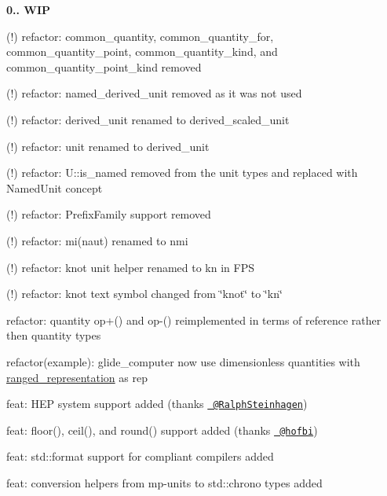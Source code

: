 
\begin{DoxyItemize}
\item {\bfseries{0.. WIP}}
\begin{DoxyItemize}
\item (!) refactor\+: {\ttfamily common\+\_\+quantity}, {\ttfamily common\+\_\+quantity\+\_\+for}, {\ttfamily common\+\_\+quantity\+\_\+point}, {\ttfamily common\+\_\+quantity\+\_\+kind}, and {\ttfamily common\+\_\+quantity\+\_\+point\+\_\+kind} removed
\item (!) refactor\+: {\ttfamily named\+\_\+derived\+\_\+unit} removed as it was not used
\item (!) refactor\+: {\ttfamily derived\+\_\+unit} renamed to {\ttfamily derived\+\_\+scaled\+\_\+unit}
\item (!) refactor\+: {\ttfamily unit} renamed to {\ttfamily derived\+\_\+unit}
\item (!) refactor\+: {\ttfamily U\+::is\+\_\+named} removed from the unit types and replaced with {\ttfamily Named\+Unit} concept
\item (!) refactor\+: {\ttfamily Prefix\+Family} support removed
\item (!) refactor\+: {\ttfamily mi(naut)} renamed to {\ttfamily nmi}
\item (!) refactor\+: {\ttfamily knot} unit helper renamed to {\ttfamily kn} in FPS
\item (!) refactor\+: {\ttfamily knot} text symbol changed from {\ttfamily \char`\"{}knot\char`\"{}} to {\ttfamily \char`\"{}kn\char`\"{}}
\item refactor\+: {\ttfamily quantity} {\ttfamily op+()} and {\ttfamily op-\/()} reimplemented in terms of {\ttfamily reference} rather then {\ttfamily quantity} types
\item refactor(example)\+: {\ttfamily glide\+\_\+computer} now use dimensionless quantities with {\ttfamily \mbox{\hyperlink{classranged__representation}{ranged\+\_\+representation}}} as {\ttfamily rep}
\item feat\+: HEP system support added (thanks \href{https://github.com/RalphSteinhagen}{\texttt{ @\+Ralph\+Steinhagen}})
\item feat\+: {\ttfamily floor()}, {\ttfamily ceil()}, and {\ttfamily round()} support added (thanks \href{https://github.com/hofbi}{\texttt{ @hofbi}})
\item feat\+: {\ttfamily std\+::format} support for compliant compilers added
\item feat\+: conversion helpers from {\ttfamily mp-\/units} to {\ttfamily std\+::chrono} types added

\end{DoxyItemize}
\end{DoxyItemize}
